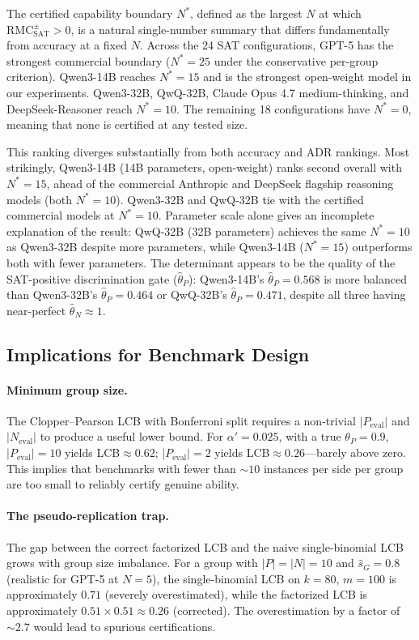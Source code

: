 \documentclass[conference]{IEEEtran}
\theoremstyle{remark}
\newcommand{\RMCSAT}{\mathrm{RMC}_{\mathrm{SAT}}}
\newcommand{\thetaP}{\hat{\theta}_P}
\newcommand{\thetaN}{\hat{\theta}_N}
\newcommand{\shat}{\hat{s}_G}
\begin{document}
The certified capability boundary $N^*$, defined as the largest $N$ at which $\RMCSAT^{\pm}>0$, is a natural single-number summary that differs fundamentally from accuracy at a fixed $N$.  Across the 24 SAT configurations, GPT-5 has the strongest commercial boundary ($N^*=25$ under the conservative per-group criterion).  Qwen3-14B reaches $N^*=15$ and is the strongest open-weight model in our experiments.  Qwen3-32B, QwQ-32B, Claude Opus 4.7 medium-thinking, and DeepSeek-Reasoner reach $N^*=10$.  The remaining 18 configurations have $N^*=0$, meaning that none is certified at any tested size.

This ranking diverges substantially from both accuracy and ADR rankings.
Most strikingly, Qwen3-14B (14B parameters, open-weight) ranks second overall with $N^*=15$, ahead of the commercial Anthropic and DeepSeek flagship reasoning models (both $N^*=10$).
Qwen3-32B and QwQ-32B tie with the certified commercial models at $N^*=10$.
Parameter scale alone gives an incomplete explanation of the result: QwQ-32B (32B parameters) achieves the same $N^*=10$ as Qwen3-32B despite more parameters, while Qwen3-14B ($N^*=15$) outperforms both with fewer parameters.
The determinant appears to be the quality of the SAT-positive discrimination gate ($\thetaP$): Qwen3-14B's $\thetaP=0.568$ is more balanced than Qwen3-32B's $\thetaP=0.464$ or QwQ-32B's $\thetaP=0.471$, despite all three having near-perfect $\thetaN\approx 1$.

\subsection{Implications for Benchmark Design}

\paragraph{Minimum group size.}
The Clopper--Pearson LCB with Bonferroni split requires a non-trivial $|P_{\mathrm{eval}}|$ and $|N_{\mathrm{eval}}|$ to produce a useful lower bound.
For $\alpha'=0.025$, with a true $\theta_P=0.9$, $|P_{\mathrm{eval}}|=10$ yields LCB$\approx0.62$; $|P_{\mathrm{eval}}|=2$ yields LCB$\approx0.26$---barely above zero.
This implies that benchmarks with fewer than $\sim10$ instances per side per group are too small to reliably certify genuine ability.

\paragraph{The pseudo-replication trap.}
The gap between the correct factorized LCB and the naive single-binomial LCB grows with group size imbalance.
For a group with $|P|=|N|=10$ and $\shat=0.8$ (realistic for GPT-5 at $N=5$), the single-binomial LCB on $k=80$, $m=100$ is approximately $0.71$ (severely overestimated), while the factorized LCB is approximately $0.51\times0.51\approx0.26$ (corrected).
The overestimation by a factor of $\sim2.7$ would lead to spurious certifications.
\end{document}
